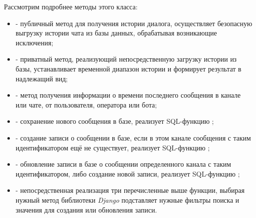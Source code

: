     Рассмотрим подробнее методы этого класса:
    \begin{itemize}
        \item {} - публичный метод для получения истории диалога, осуществляет
        безопасную выгрузку истории чата из базы данных, обрабатывая возникающие исключения;
        \item {} - приватный метод, реализующий непосредственную загрузку истории из базы,
        устанавливает временной диапазон истории и формирует результат в надлежащий вид;
        \item {} - метод получения информации о времени последнего сообщения
        в канале или чате, от пользователя, оператора или бота;
        \item {} - сохранение нового сообщения в базе, реализует SQL-функцию ;
        \item {} - создание записи о сообщении в базе, если в этом канале сообщения с таким
        идентификатором ещё не существует, реализует SQL-функцию ;
        \item {} - обновление записи в базе о сообщении определенного канала с таким
        идентификатором, либо создание новой записи, реализует SQL-функцию ;
        \item {} - непосредственная реализация три перечисленные выше функции, выбирая нужный
        метод библиотеки \textit{Django} подставляет нужные фильтры поиска и значения для создания
        или обновления записи.
    \end{itemize}


